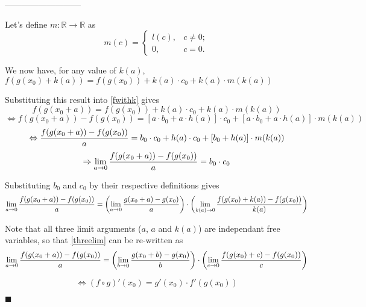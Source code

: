 \documentclass[a4paper]{article}
\begin{document}
    \bigskip
    \centerline{---------------------------}
    \bigskip

    Let's define $m : \mathbb{R} \rightarrow \mathbb{R}$ as
    $$
        m(c) = 
        \begin{cases}
          l(c), & c \neq 0; \\
          0, & c = 0.
        \end{cases}
    $$

    \bigskip
    We now have, for any value of $k(a)$, 
    $f(g(x_0)+k(a)) = f(g(x_0)) + k(a) \cdot c_0 + k(a) \cdot m(k(a))$

    \bigskip
    Substituting this result into \eqref{fwithk} gives
    $$
        f(g(x_0+a)) = f(g(x_0)) + k(a) \cdot c_0 + k(a) \cdot m(k(a))
    $$
    $$
        \Leftrightarrow f(g(x_0+a)) - f(g(x_0)) = 
        [a \cdot b_0 + a \cdot h(a)] \cdot c_0 
        + [a \cdot b_0 + a \cdot h(a)] \cdot m(k(a))
    $$
    $$
        \Leftrightarrow {{f(g(x_0+a)) - f(g(x_0))} \over a} = 
        b_0 \cdot c_0 + h(a) \cdot c_0 
        + [b_0 + h(a)] \cdot m(k(a))
    $$
    $$
        \Rightarrow \lim_{a \to 0}{{f(g(x_0+a)) - f(g(x_0))} \over a} = 
        b_0 \cdot c_0
    $$

    \bigskip
    Substituting $b_0$ and $c_0$ by their respective definitions gives
    \begin{equation}
        \label{threelim}
        \lim_{a \to 0}{{f(g(x_0+a)) - f(g(x_0))} \over a} = 
        \left(\lim_{a \to 0}{{g(x_0+a) - g(x_0)} \over a}\right) \cdot 
        \left(\lim_{k(a) \to 0}{{f(g(x_0)+k(a)) - f(g(x_0))} \over k(a)}\right)
    \end{equation}

    \bigskip
    Note that all three limit arguments ($a$, $a$ and $k(a)$) are independant
    free variables, so that \eqref{threelim} can be re-written as
    $$
        \lim_{a \to 0}{{f(g(x_0+a)) - f(g(x_0))} \over a} = 
        \left(\lim_{b \to 0}{{g(x_0+b) - g(x_0)} \over b}\right) \cdot 
        \left(\lim_{c \to 0}{{f(g(x_0)+c) - f(g(x_0))} \over c}\right)
    $$

    $$
        \Leftrightarrow
        \boxed
        {
          (f \circ g)'(x_0) = g'(x_0) \cdot f'(g(x_0))
        }
    $$
    \begin{flushright}
    $\blacksquare$
    \end{flushright}
\end{document}
